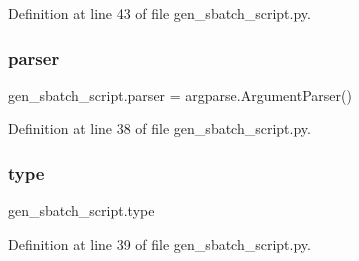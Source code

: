 Definition at line 43 of file gen\+\_\+sbatch\+\_\+script.\+py.

\mbox{\label{namespacegen__sbatch__script_ac43dee5d4a8d487195b0c514b4240b7e}} 
\subsubsection{\texorpdfstring{parser}{parser}}
{\footnotesize\ttfamily gen\+\_\+sbatch\+\_\+script.\+parser = argparse.\+Argument\+Parser()}



Definition at line 38 of file gen\+\_\+sbatch\+\_\+script.\+py.

\mbox{\label{namespacegen__sbatch__script_ad99f6e146084025f0156721f691dc1cf}} 
\subsubsection{\texorpdfstring{type}{type}}
{\footnotesize\ttfamily gen\+\_\+sbatch\+\_\+script.\+type}



Definition at line 39 of file gen\+\_\+sbatch\+\_\+script.\+py.


